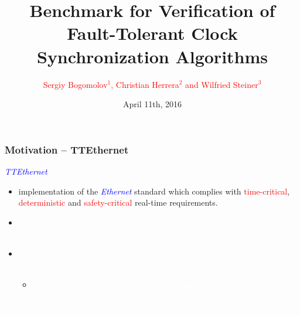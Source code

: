 \documentclass[serif]{beamer}
\begin{document}
\title{\centering \textbf{Benchmark for Verification of Fault-Tolerant Clock\\
Synchronization Algorithms}} 
\author{\textcolor{red}{Sergiy Bogomolov$^{1}$, Christian Herrera$^{2}$ and Wilfried Steiner$^{3}$}  
	}
\date{April 11th, 2016}
\begin{frame}
\titlepage
\end{frame}
 

\begin{frame}\frametitle{\textbf{Motivation -- TTEthernet}}
\emph{\textcolor{blue}{TTEthernet}}  
\begin{itemize}
\item implementation of the \emph{\textcolor{blue}{Ethernet}} standard which complies with
\textcolor{red}{time-critical}, \textcolor{red}{deterministic} and \textcolor{red}{safety-critical} real-time requirements.

\item[] \textcolor{white}{used in commercial \textcolor{white}{hardware} and \textcolor{white}{software} products,
e.g. the avionics of the \emph{\textcolor{white}{Orion Space Program}}.}

\item[] \textcolor{white}{assumes a \textcolor{white}{global time base} for tolerating faulty behavior of safety critical systems.}
	\begin{itemize}
		\item[]  \textcolor{white}{any two logical clocks of two distributed
						components must read \textcolor{white}{the same values} at any time (\emph{\textcolor{white}{precision}}).
						The precision is ensured by a \textcolor{white}{clock synchronization algorithm}. }
	\end{itemize}
\end{itemize}
\end{frame} 
\end{document}
